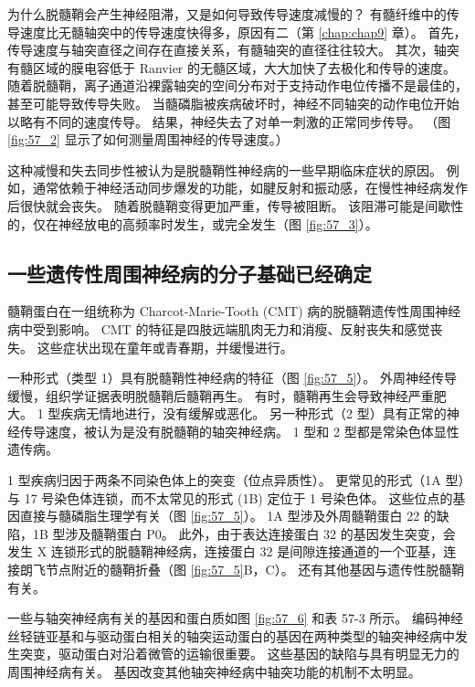 为什么脱髓鞘会产生神经阻滞，又是如何导致传导速度减慢的？
有髓纤维中的传导速度比无髓轴突中的传导速度快得多，原因有二（第 \ref{chap:chap9} 章）。
首先，传导速度与轴突直径之间存在直接关系，有髓轴突的直径往往较大。
其次，轴突有髓区域的膜电容低于 Ranvier 的无髓区域，大大加快了去极化和传导的速度。
随着脱髓鞘，离子通道沿裸露轴突的空间分布对于支持动作电位传播不是最佳的，甚至可能导致传导失败。
当髓磷脂被疾病破坏时，神经不同轴突的动作电位开始以略有不同的速度传导。
结果，神经失去了对单一刺激的正常同步传导。
（图 \ref{fig:57_2} 显示了如何测量周围神经的传导速度。）


这种减慢和失去同步性被认为是脱髓鞘性神经病的一些早期临床症状的原因。
例如，通常依赖于神经活动同步爆发的功能，如腱反射和振动感，在慢性神经病发作后很快就会丧失。
随着脱髓鞘变得更加严重，传导被阻断。
该阻滞可能是间歇性的，仅在神经放电的高频率时发生，或完全发生（图 \ref{fig:57_3}）。



\subsection{一些遗传性周围神经病的分子基础已经确定}

髓鞘蛋白在一组统称为 Charcot-Marie-Tooth (CMT) 病的脱髓鞘遗传性周围神经病中受到影响。
CMT 的特征是四肢远端肌肉无力和消瘦、反射丧失和感觉丧失。
这些症状出现在童年或青春期，并缓慢进行。


一种形式（类型 1）具有脱髓鞘性神经病的特征（图 \ref{fig:57_5}）。
外周神经传导缓慢，组织学证据表明脱髓鞘后髓鞘再生。
有时，髓鞘再生会导致神经严重肥大。
1 型疾病无情地进行，没有缓解或恶化。
另一种形式（2 型）具有正常的神经传导速度，被认为是没有脱髓鞘的轴突神经病。
1 型和 2 型都是常染色体显性遗传病。


1 型疾病归因于两条不同染色体上的突变（位点异质性）。
更常见的形式（1A 型）与 17 号染色体连锁，而不太常见的形式 (1B) 定位于 1 号染色体。
这些位点的基因直接与髓磷脂生理学有关（图 \ref{fig:57_5}）。
1A 型涉及外周髓鞘蛋白 22 的缺陷，1B 型涉及髓鞘蛋白 P0。
此外，由于表达连接蛋白 32 的基因发生突变，会发生 X 连锁形式的脱髓鞘神经病，连接蛋白 32 是间隙连接通道的一个亚基，连接朗飞节点附近的髓鞘折叠（图 \ref{fig:57_5}B，C）。
还有其他基因与遗传性脱髓鞘有关。


一些与轴突神经病有关的基因和蛋白质如图 \ref{fig:57_6} 和表 57-3 所示。
编码神经丝轻链亚基和与驱动蛋白相关的轴突运动蛋白的基因在两种类型的轴突神经病中发生突变，驱动蛋白对沿着微管的运输很重要。
这些基因的缺陷与具有明显无力的周围神经病有关。
基因改变其他轴突神经病中轴突功能的机制不太明显。


